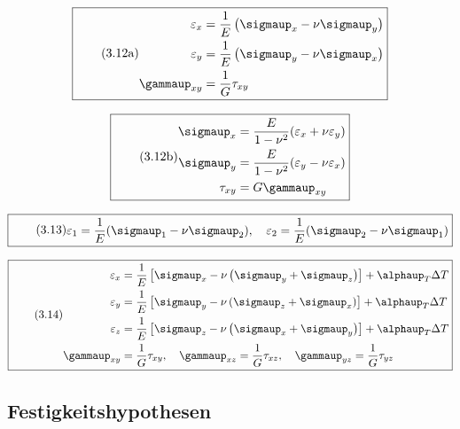 \documentclass[11pt]{article}
\newcommand{\1}{ {\mathds{1}} }
\renewcommand{\alpha  }{\alphaup   }
\renewcommand{\epsilon}{\varepsilon}
\renewcommand{\gamma  }{\gammaup   }
\renewcommand{\sigma  }{\sigmaup   }
\begin{document}
		\begin{equation}
			\boxed{
				\tag{3.12a}
				\begin{split}
					\varepsilon_x &= \frac{1}{E}\left(\sigma_x - \nu \sigma_y\right)
					\\
					\varepsilon_y &= \frac{1}{E}\left(\sigma_y - \nu \sigma_x\right)
					\\
			\gamma_{xy} &= \frac{1}{G}\tau_{xy}
				\end{split}
			}
		\end{equation}

		\begin{equation}
			\boxed{
				\tag{3.12b}
				\begin{split}
					\sigma_x &= \frac{E}{1 - \nu^2}(\epsilon_x + \nu \epsilon_y) \\
					\sigma_y &= \frac{E}{1 -\nu^2}(\epsilon_y - \nu \epsilon_x) \\
					\tau_{xy} &= G \gamma_{xy}
				\end{split}
			}
		\end{equation}

		\begin{equation}
			\boxed{
				\tag{3.13}
				\begin{split}
					\epsilon_1 = \frac{1}{E}(\sigma_1 -\nu\sigma_2), \quad \epsilon_2 = \frac{1}{E}(\sigma_2 -\nu\sigma_1)
				\end{split}
			}
		\end{equation}

		\begin{equation}
			\boxed{
				\tag{3.14}
				\begin{split}
					\varepsilon_x &= \frac{1}{E}\left[\sigma_x -\nu   \left(\sigma_y + \sigma_z\right)\right] + \alpha_T\Delta T
					\\
					\varepsilon_y &= \frac{1}{E}\left[\sigma_y -\nu   \left(\sigma_z + \sigma_x\right)\right] + \alpha_T\Delta T\\
					\varepsilon_z &= \frac{1}{E}\left[\sigma_z -\nu   \left(\sigma_x + \sigma_y\right)\right] + \alpha_T\Delta T\\
					\gamma_{xy} &= \frac{1}{G}\tau_{xy}, \quad \gamma_{xz} = \frac{1}{G}\tau_{xz}, \quad \gamma_{yz} = \frac{1}{G}\tau_{yz}
				\end{split}
			}
		\end{equation}

		\subsection{Festigkeitshypothesen}
\end{document}
